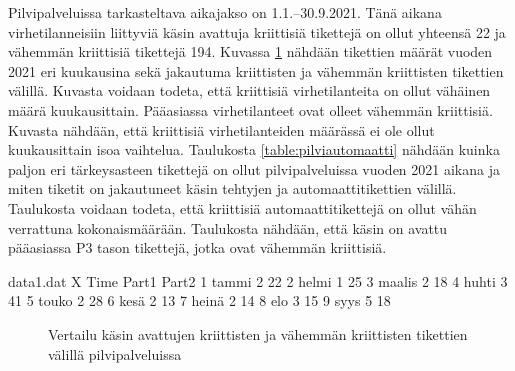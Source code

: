 Pilvipalveluissa tarkasteltava aikajakso on 1.1.--30.9.2021. Tänä aikana virhetilanneisiin liittyviä käsin avattuja kriittisiä tikettejä on ollut yhteensä 22 ja vähemmän kriittisiä tikettejä 194. Kuvassa \ref{fig:pilvitiketit} nähdään tikettien määrät vuoden 2021 eri kuukausina sekä jakautuma kriittisten ja vähemmän kriittisten tikettien välillä. Kuvasta voidaan todeta, että kriittisiä virhetilanteita on ollut vähäinen määrä kuukausittain. Pääasiassa virhetilanteet ovat olleet vähemmän kriittisiä. Kuvasta nähdään, että kriittisiä virhetilanteiden määrässä ei ole ollut kuukausittain isoa vaihtelua. Taulukosta \ref{table:pilviautomaatti} nähdään kuinka paljon eri tärkeysasteen tikettejä on ollut pilvipalveluissa vuoden 2021 aikana ja miten tiketit on jakautuneet käsin tehtyjen ja automaattitikettien välillä. Taulukosta voidaan todeta, että kriittisiä automaattitikettejä on ollut vähän verrattuna kokonaismäärään. Taulukosta nähdään, että käsin on avattu pääasiassa P3 tason tikettejä, jotka ovat vähemmän kriittisiä.

\begin{filecontents}{data1.dat}
X Time  	Part1  Part2
1 tammi  	2	    22
2 helmi		1	    25
3 maalis	2	    18
4 huhti		3	    41
5 touko		2	    28
6 kesä		2	    13
7 heinä		2	    14
8 elo       3       15
9 syys      5       18
\end{filecontents}

\begin{figure}[ht]
\caption{Vertailu käsin avattujen kriittisten ja vähemmän kriittisten tikettien välillä pilvipalveluissa}
\label{fig:pilvitiketit}
\end{figure}

